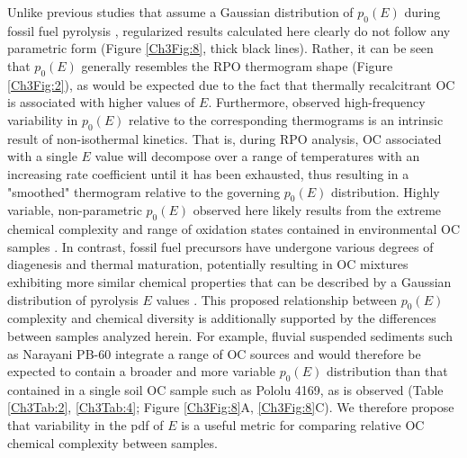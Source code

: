 Unlike previous studies that assume a Gaussian distribution of $p_{0}(E)$ during fossil fuel pyrolysis \citep{Lakshmanan:1994vs,Cai:2007hh,deCaprariis:2012jk}, regularized results calculated here clearly do not follow any parametric form (Figure \ref{Ch3Fig:8}, thick black lines). Rather, it can be seen that $p_{0}(E)$ generally resembles the RPO thermogram shape (Figure \ref{Ch3Fig:2}), as would be expected due to the fact that thermally recalcitrant OC is associated with higher values of $E$. Furthermore, observed high-frequency variability in $p_{0}(E)$ relative to the corresponding thermograms is an intrinsic result of non-isothermal kinetics. That is, during RPO analysis, OC associated with a single $E$ value will decompose over a range of temperatures with an increasing rate coefficient until it has been exhausted, thus resulting in a "smoothed" thermogram relative to the governing $p_{0}(E)$ distribution. Highly variable, non-parametric $p_{0}(E)$ observed here likely results from the extreme chemical complexity and  range of oxidation states contained in environmental OC samples \citep[\textit{e.g.}][]{Kellerman:2015jn}. In contrast, fossil fuel precursors have undergone various degrees of diagenesis and thermal maturation, potentially resulting in OC mixtures exhibiting more similar chemical properties that can be described by a Gaussian distribution of pyrolysis $E$ values \citep{Braun:1987vf}. This proposed relationship between $p_{0}(E)$ complexity and chemical diversity is additionally supported by the differences between samples analyzed herein. For example, fluvial suspended sediments such as Narayani PB-60 integrate a range of OC sources \citep[\textit{e.g.} recently fixed biomass, pre-aged soils, and eroded rock-derived material;][]{Blair:2012du} and would therefore be expected to contain a broader and more variable $p_{0}(E)$ distribution than that contained in a single soil OC sample such as Pololu 4169, as is observed (Table \ref{Ch3Tab:2}, \ref{Ch3Tab:4}; Figure \ref{Ch3Fig:8}A, \ref{Ch3Fig:8}C). We therefore propose that variability in the pdf of $E$ is a useful metric for comparing relative OC chemical complexity between samples.

